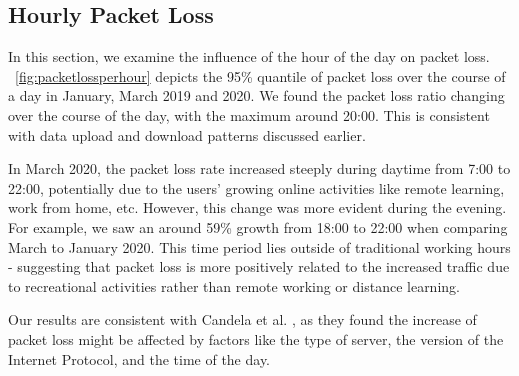 \subsection{Hourly Packet Loss}

In this section, we examine the influence of the hour of the day on packet loss. \figurename~\ref{fig:packetlossperhour} depicts the 95\% quantile of packet loss over the course of a day in January, March 2019 and 2020. We found the packet loss ratio changing over the course of the day, with the maximum around 20:00. This is consistent with data upload and download patterns discussed earlier.

In March 2020, the packet loss rate increased steeply during daytime from 7:00 to 22:00, potentially due to the users' growing online activities like remote learning, work from home, etc. However, this change was more evident during the evening. For example, we saw an around 59\% growth from 18:00 to 22:00 when comparing March to January 2020. This time period lies outside of traditional working hours - suggesting that packet loss is more positively related to the increased traffic due to recreational activities rather than remote working or distance learning.

Our results are consistent with Candela et al. \cite{Candela2020latency}, as they found the increase of packet loss might be affected by factors like the type of server, the version of the Internet Protocol, and the time of the day.

